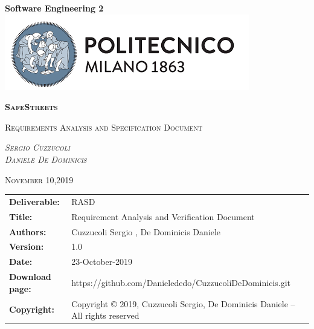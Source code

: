







\begin{titlepage}
	\centering
	\Large\textbf{Software Engineering 2}
	\includegraphics[width=\textwidth]{Images/PolimiLogo}\par\vspace{1cm}
	{\scshape\Huge\textbf{SafeStreets}\par}
	\vspace{1cm}
	{\scshape\Large Requirements Analysis and Specification Document\par}
	\vspace{2cm}
	{\scshape\Large\emph{Sergio Cuzzucoli}\\ \emph{Daniele De Dominicis}\par}
	\vspace{4cm}
	{\scshape\normalsize{November 10,2019}}

\end{titlepage}

\begin{table}[h!]
\begin{tabu} to \textwidth { X[0.3,r,p] X[0.7,l,p] }
\hline

\textbf{Deliverable:} & RASD\\
\textbf{Title:} & Requirement Analysis and Verification Document \\
\textbf{Authors:} & Cuzzucoli Sergio , De Dominicis Daniele \\
\textbf{Version:} & 1.0 \\ 
\textbf{Date:} & 23-October-2019  \\
\textbf{Download page:} & https://github.com/Danielededo/CuzzucoliDeDominicis.git \\
\textbf{Copyright:} & Copyright © 2019, Cuzzucoli Sergio, De Dominicis Daniele – All rights reserved \\
\hline
\end{tabu}
\end{table}




